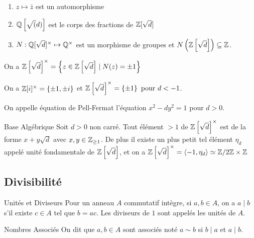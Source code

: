\documentclass{cours}
\begin{document}
\begin{lemma}
    \begin{enumerate}
        \item $z \mapsto \bar{z}$ est un automorphisme
        \item $\mathbb{Q}\left[\sqrt(d)\right]$ est le corps des fractions de $\mathbb{Z}[\sqrt{d}]$
        \item $N : \mathbb{Q}[\sqrt{d}]^{\times} \mapsto \mathbb{Q}^{\times}$ est un morphisme de groupes et $N\left(\mathbb{Z}\left[\sqrt{d}\right]\right) \subseteq \mathbb{Z}$.
    \end{enumerate}
\end{lemma}

\begin{lemma}
    On a $ \mathbb{Z}\left[\sqrt{d}\right]^{\times} = \left\{z \in \mathbb{Z}\left[\sqrt{d}\right] \mid N(z) = \pm 1\right\}$
\end{lemma}

\begin{corollaire}{}{}
    On a $\mathbb{Z}[i]^{\times} = \left\{\pm 1, \pm i\right\}$ et $\mathbb{Z}\left[\sqrt{d}\right]^{\times} = \left\{\pm 1\right\} \text{ pour } d < -1$.
\end{corollaire}

\begin{remark}
    On appelle équation de Pell-Fermat l'équation $x^{2} - dy^{2} = 1$ pour $d > 0$.
\end{remark}

\begin{propositionfr}{Base Algébrique}{}
    Soit $d > 0$ non carré. Tout élément $> 1$ de $\mathbb{Z}\left[\sqrt{d}\right]^{\times}$ est de la forme $x + y\sqrt{d}$ avec $x, y \in \mathbb{Z}_{\geq 1}$. De plus il existe un plus petit tel élément $\eta_{d}$ appelé unité fondamentale de $\mathbb{Z}\left[\sqrt{d}\right]$, et on a $\mathbb{Z}\left[\sqrt{d}\right]^{\times} = \left\langle -1, \eta_{d} \right\rangle \simeq \mathbb{Z}/2\mathbb{Z} \times \mathbb{Z}$
\end{propositionfr}

\subsection{Divisibilité}
\begin{définition}{Unités et Diviseurs}{}
    Pour un anneau $A$ commutatif intègre, si $a, b \in A$, on a $a\mid b$ s'il existe $c\in A$ tel que $b = ac$. Les diviseurs de $1$ sont appelés les unités de $A$.
\end{définition}

\begin{définition}{Nombres Associés}{}
    On dit que $a, b \in A$ sont associés noté $a \sim b$ si $b \mid a$ et $a \mid b$.
\end{définition}
\end{document}
